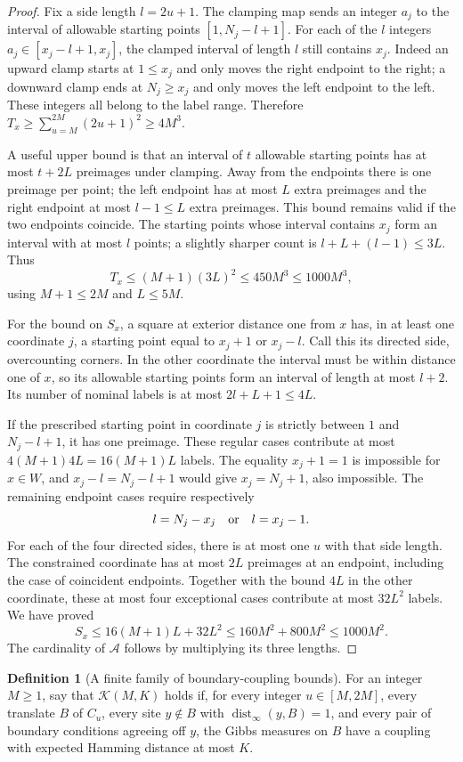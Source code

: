 \documentclass[11pt]{amsart}
\theoremstyle{definition}
\newtheorem{definition}[theorem]{Definition}
\newcommand{\dist}{\operatorname{dist}_\infty}
\newcommand{\1}{\mathbf 1}
\begin{document}
\begin{proof}
Fix a side length $l=2u+1$. The clamping map sends an integer $a_j$ to
the interval of allowable starting points $[1,N_j-l+1]$.
For each of the $l$ integers
$a_j\in[x_j-l+1,x_j]$, the clamped interval of length $l$ still contains
$x_j$. Indeed an upward clamp starts at $1\le x_j$ and only moves the
right endpoint to the right; a downward clamp ends at $N_j\ge x_j$ and
only moves the left endpoint to the left. These integers all belong to
the label range. Therefore $T_x\ge\sum_{u=M}^{2M}(2u+1)^2
\ge4M^3$.

A useful upper bound is that an interval of $t$ allowable starting points
has at most $t+2L$ preimages under clamping. Away from the endpoints there
is one preimage per point; the left endpoint has at most $L$ extra
preimages and the right endpoint at most $l-1\le L$ extra preimages.
This bound remains valid if the two endpoints coincide.
The starting points whose interval contains $x_j$ form an interval with
at most $l$ points; a slightly sharper count is
$l+L+(l-1)\le3L$. Thus
\[
 T_x\le(M+1)(3L)^2\le450M^3\le1000M^3,
\]
using $M+1\le2M$ and $L\le5M$.

For the bound on $S_x$, a square at exterior distance one from $x$ has,
in at least one coordinate $j$, a starting point equal to
$x_j+1$ or $x_j-l$. Call this its directed side, overcounting corners.
In the other coordinate the interval must be within distance one of
$x$, so its allowable starting points form an interval of length at most
$l+2$. Its number of nominal labels is at most
$2l+L+1\le4L$.

If the prescribed starting point in coordinate $j$ is strictly between
$1$ and $N_j-l+1$, it has one preimage. These regular cases contribute
at most $4(M+1)4L=16(M+1)L$ labels.
The equality $x_j+1=1$ is impossible for $x\in W$, and
$x_j-l=N_j-l+1$ would give $x_j=N_j+1$, also impossible.
The remaining endpoint cases require respectively
\[
 l=N_j-x_j\quad\hbox{or}\quad l=x_j-1.
\]
For each of the four directed sides, there is at most one $u$ with
that side length. The constrained coordinate has at most $2L$ preimages
at an endpoint, including the case of coincident endpoints. Together
with the bound $4L$ in the other coordinate, these at most four
exceptional cases contribute at most $32L^2$ labels. We have proved
\[
 S_x\le16(M+1)L+32L^2\le160M^2+800M^2\le1000M^2.
\]
The cardinality of $\mathcal A$ follows by multiplying its three lengths.
\end{proof}

\begin{definition}[A finite family of boundary-coupling bounds]
\label{def:Kcriterion}
For an integer $M\ge1$, say that $\mathcal K(M,K)$ holds if, for every
integer $u\in[M,2M]$, every translate $B$ of $C_u$, every site
$y\notin B$ with $\dist(y,B)=1$, and every pair of boundary conditions
agreeing off $y$, the Gibbs measures on $B$ have a coupling with
expected Hamming distance at most $K$.
\end{definition}
\end{document}
